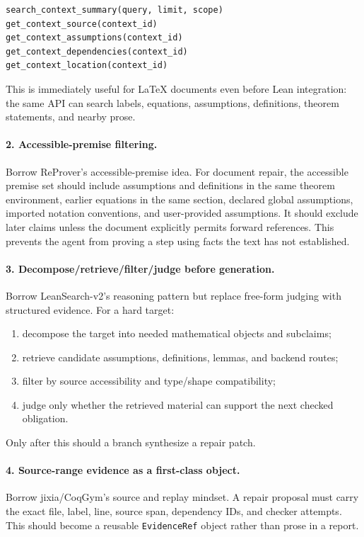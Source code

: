 \documentclass[11pt]{article}
\begin{document}
\begin{verbatim}
search_context_summary(query, limit, scope)
get_context_source(context_id)
get_context_assumptions(context_id)
get_context_dependencies(context_id)
get_context_location(context_id)
\end{verbatim}

This is immediately useful for LaTeX documents even before Lean integration:
the same API can search labels, equations, assumptions, definitions, theorem
statements, and nearby prose.

\paragraph{2. Accessible-premise filtering.}
Borrow ReProver's accessible-premise idea. For document repair, the accessible
premise set should include assumptions and definitions in the same theorem
environment, earlier equations in the same section, declared global
assumptions, imported notation conventions, and user-provided assumptions. It
should exclude later claims unless the document explicitly permits forward
references. This prevents the agent from proving a step using facts the text
has not established.

\paragraph{3. Decompose/retrieve/filter/judge before generation.}
Borrow LeanSearch-v2's reasoning pattern but replace free-form judging with
structured evidence. For a hard target:

\begin{enumerate}[leftmargin=*]
\item decompose the target into needed mathematical objects and subclaims;
\item retrieve candidate assumptions, definitions, lemmas, and backend routes;
\item filter by source accessibility and type/shape compatibility;
\item judge only whether the retrieved material can support the next checked
  obligation.
\end{enumerate}

Only after this should a branch synthesize a repair patch.

\paragraph{4. Source-range evidence as a first-class object.}
Borrow jixia/CoqGym's source and replay mindset. A repair proposal must carry
the exact file, label, line, source span, dependency IDs, and checker attempts.
This should become a reusable \texttt{EvidenceRef} object rather than prose in
a report.
\end{document}
